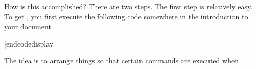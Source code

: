 How is this accomplished?  There are two steps.  The first step is
relatively easy.  To get , you first execute the following code
somewhere in the introduction to your document

\codedisplay
{}
|endcodedisplay





The idea is to arrange things so that
certain commands are executed when

